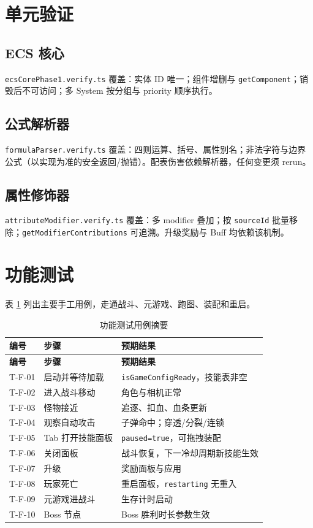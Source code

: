 \documentclass[UTF8,a4paper]{ctexart}
\begin{document}
\section{单元验证}

\subsection{ECS 核心}

\texttt{ecsCorePhase1.verify.ts} 覆盖：实体 ID 唯一；组件增删与 \texttt{getComponent}；销毁后不可访问；多 System 按分组与 priority 顺序执行\cite{petty2010vv}。

\subsection{公式解析器}

\texttt{formulaParser.verify.ts} 覆盖：四则运算、括号、属性别名；非法字符与边界公式（以实现为准的安全返回/抛错）。配表伤害依赖解析器，任何变更须 rerun。

\subsection{属性修饰器}

\texttt{attributeModifier.verify.ts} 覆盖：多 modifier 叠加；按 \texttt{sourceId} 批量移除；\texttt{getModifierContributions} 可追溯。升级奖励与 Buff 均依赖该机制\cite{briand2001maintainability}。

\section{功能测试}

表 \ref{tab:test-func} 列出主要手工用例，走通战斗、元游戏、跑图、装配和重启。

\begin{longtable}{p{2.2cm}p{4.5cm}p{6.3cm}}
  \caption{功能测试用例摘要} \label{tab:test-func} \\
  \toprule
  \textbf{编号} & \textbf{步骤} & \textbf{预期结果} \\
  \midrule
  \endfirsthead
  \toprule
  \textbf{编号} & \textbf{步骤} & \textbf{预期结果} \\
  \midrule
  \endhead
  T-F-01 & 启动并等待加载 & \texttt{isGameConfigReady}，技能表非空 \\
  T-F-02 & 进入战斗移动 & 角色与相机正常 \\
  T-F-03 & 怪物接近 & 追逐、扣血、血条更新 \\
  T-F-04 & 观察自动攻击 & 子弹命中；穿透/分裂/连锁 \\
  T-F-05 & Tab 打开技能面板 & \texttt{paused=true}，可拖拽装配 \\
  T-F-06 & 关闭面板 & 战斗恢复，下一冷却周期新技能生效 \\
  T-F-07 & 升级 & 奖励面板与应用 \\
  T-F-08 & 玩家死亡 & 重启面板，\texttt{restarting} 无重入 \\
  T-F-09 & 元游戏进战斗 & 生存计时启动 \\
  T-F-10 & Boss 节点 & Boss 胜利时长参数生效 \\
  \bottomrule
\end{longtable}
\end{document}
